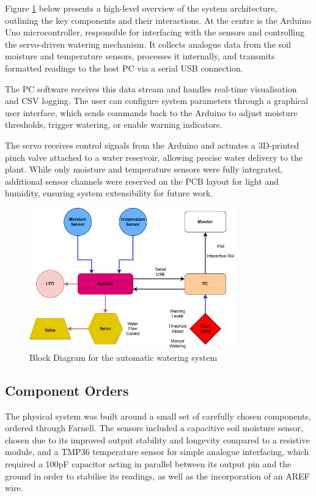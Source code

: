 \documentclass[a4paper,11pt]{article}
\begin{document}
Figure \ref{fig:Block_Diagram_for_the_automatic_watering_system} below presents a high-level overview 
of the system architecture, outlining the key components and their interactions. 
At the centre is the Arduino Uno microcontroller, responsible for interfacing with 
the sensors and controlling the servo-driven watering mechanism. 
It collects analogue data from the soil moisture and temperature sensors, 
processes it internally, and transmits formatted readings 
to the host PC via a serial USB connection.

The PC software receives this data stream and handles real-time visualisation
and CSV logging.
The user can configure system parameters through a graphical user interface, 
which sends commands back to the Arduino to adjust moisture thresholds, 
trigger watering, or enable warning indicators.

The servo receives control signals from the Arduino and actuates a 3D-printed pinch valve 
attached to a water reservoir, allowing precise water delivery to the plant. 
While only moisture and temperature sensors were fully integrated, 
additional sensor channels were reserved on the PCB layout for light and humidity, 
ensuring system extensibility for future work.

\begin{figure}[H]
    \centering
    \includegraphics[width=0.8\textwidth]{Datalogger Block Diagram - final.png}
    \caption{Block Diagram for the automatic watering system}
    \label{fig:Block_Diagram_for_the_automatic_watering_system}
\end{figure}

\subsection{Component Orders}
\label{sec:Components}
The physical system was built around a small set of carefully chosen components, 
ordered through Farnell. 
The sensors included a capacitive soil moisture sensor, 
chosen due to its improved output stability and longevity compared to a resistive module,
and a TMP36 temperature sensor for simple analogue interfacing, 
which required a 100pF capacitor acting in parallel between its output pin and the ground
in order to stabilise its readings, 
as well as the incorporation of an AREF wire.
\end{document}
